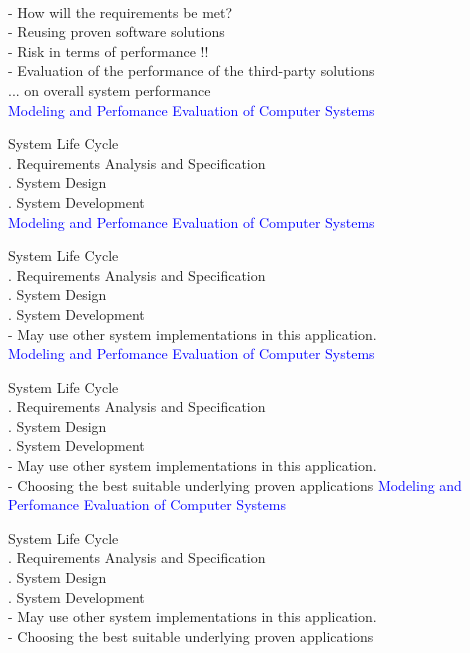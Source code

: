 \documentclass[svgnames]{beamer}
\begin{document}
\\[20pt]
- How will the requirements be met?\\
- Reusing proven software solutions \\
- Risk in terms of performance !!\\
- Evaluation of the performance of the third-party solutions\\
 ... on overall system performance\\
\newpage
\textcolor{blue}{Modeling and Perfomance Evaluation of Computer Systems} \\[38pt]
\raggedright
\! System Life Cycle\\
. Requirements Analysis and Specification\\
. System Design\\
. System Development\\
\newpage
\textcolor{blue}{Modeling and Perfomance Evaluation of Computer Systems} \\[38pt]
\raggedright
\! System Life Cycle\\
. Requirements Analysis and Specification\\
. System Design\\
. System Development\\[18pt]
- May use other system implementations in this application.\\
\newpage
\textcolor{blue}{Modeling and Perfomance Evaluation of Computer Systems} \\[38pt]
\raggedright
\! System Life Cycle\\
. Requirements Analysis and Specification\\
. System Design\\
. System Development\\[18pt]
- May use other system implementations in this application.\\
- Choosing the best suitable underlying proven applications
\newpage
\textcolor{blue}{Modeling and Perfomance Evaluation of Computer Systems} \\[38pt]
\raggedright
\! System Life Cycle\\
. Requirements Analysis and Specification\\
. System Design\\
. System Development\\[18pt]
- May use other system implementations in this application.\\
- Choosing the best suitable underlying proven applications\\
\end{document}
